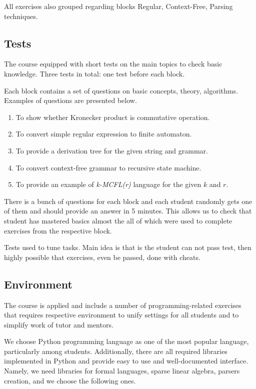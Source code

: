 \documentclass[sigconf]{acmart}
\begin{document}
All exercises also grouped regarding blocks Regular, Context-Free, Parsing techniques.

\subsection{Tests}

The course equipped with short tests on the main topics to check basic knowledge.
Three tests in total: one test before each block. 

Each block contains a set of questions on basic concepts, theory, algorithms.
Examples of questions are presented below.
\begin{enumerate}
   \item To show whether Kronecker product is commutative operation. 
   \item To convert simple regular expression to finite automaton.
   \item To provide a derivation tree for the given string and grammar.
   \item To convert context-free grammar to recursive state machine.
   \item To provide an example of \emph{k-MCFL(r)} language for the given $k$ and $r$.
\end{enumerate} 

There is a bunch of questions for each block and each student randomly gets one of them and should provide an answer in 5 minutes. 
This allows us to check that student has mastered basics almost the all of which were used to complete exercises from the respective block.

Tests used to tune tasks. Main idea is that is the student can not pass test, then highly possible that exercises, even be passed, done with cheats.


\subsection{Environment}

The course is applied and include a number of programming-related exercises that requires respective environment to unify settings for all students and to simplify work of tutor and mentors.

We choose Python programming language as one of the most popular language, particularly among students.
Additionally, there are all required libraries implemented in Python and provide easy to use and well-documented interface.
Namely, we need libraries for formal languages, sparse linear algebra, parsers creation, and we choose the following ones.
\end{document}
